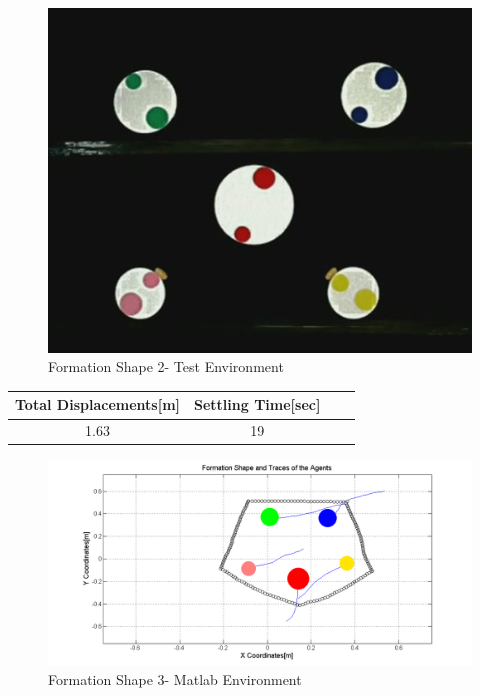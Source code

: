 \documentclass[twoside]{article}
\begin{document}
					\begin{figure}[H]
						\caption{Formation Shape 2- Test Environment}
						\centerline{\includegraphics[scale = 0.35]{4_real_hardware}}
					\end{figure} 
					
					\begin{center}
						 \label{tab:title} 
						\begin{tabular}{||c| c |c |c ||}
							
							\hline
							\textbf{Total Displacements[m]}  & \textbf{Settling Time[sec]}\\ 
							\hline
							1.63 & 19 \\
							\hline
						\end{tabular}
					\end{center}
		
		
					\begin{figure}[H]
						\caption{Formation Shape 3- Matlab Environment}
						\centerline{\includegraphics[scale = 0.45]{5_hardware}}
					\end{figure} 
					
\end{document}
